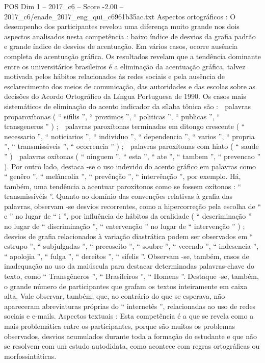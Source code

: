 \begin{textsample}{POS Dim 1 – 2017\_c6 – Score -2.00 – 2017\_c6/enade\_2017\_eng\_qui\_c6961b35ac.txt}
Aspectos ortográficos : O desempenho dos participantes revelou uma diferença muito grande nos dois aspectos analisados nesta competência : baixo índice de desvios da grafia padrão e grande índice de desvios de acentuação.
Em vários casos, ocorre ausência completa de acentuação gráfica.
Os resultados revelam que a tendência dominante entre os universitários brasileiros é a eliminação da acentuação gráfica, talvez motivada pelos hábitos relacionados às redes sociais e pela ausência de esclarecimento dos meios de comunicação, das autoridades e das escolas sobre as decisões do Acordo Ortográfico da Língua Portuguesa de 1990.
Os casos mais sistemáticos de eliminação do acento indicador da sílaba tônica são :  palavras proparoxítonas ( “ sifilis ”, “ proximos ”, “ politicas ”, “ publicas ”, “ transgeneros ” ) ;  palavras paroxítonas terminadas em ditongo crescente ( “ necessario ”, “ noticiarios ”, “ individuo ”, “ dependencia ”, “ varios ”, “ propria ”, “ transmissiveis ”, “ ocorrencia ” ) ;  palavras paroxítonas com hiato ( “ saude ” )  palavras oxítonas ( “ ninguem ”, “ esta ”, “ ate ”, “ tambem ”, “ prevencao ” ).
Por outro lado, destaca -se o uso indevido do acento gráfico em palavras como “ genêro ”, “ melâncolia ”, “ prevênção ”, “ intervênção ”, por exemplo.
Há, também, uma tendência a acentuar paroxítonos como se fossem oxítonos : “ transmissivéis ”.
Quanto ao domínio das convenções relativas à grafia das palavras, observam -se desvios recorrentes, como a hipercorreção pela escolha de “ e ” no lugar de “ i ”, por influência de hábitos da oralidade ( “ descriminação ” no lugar de “ discriminação ”, “ entervenção ” no lugar de “ intervenção ” ) ; desvios de grafia relacionados à variação diastrática podem ser observados em “ estrupo ”, “ subjulgadas ”, “ precoseito ”, “ soubre ”, “ vecendo ”, “ indesencia ”, “ apolojia ”, “ fulga ”, “ dereitos ”, “ sifelis ”.
Observam -se, também, casos de inadequação no uso da maiúscula para destacar determinadas palavras-chave do texto, como “ Transgêneros ”, “ Brasileiros ”, “ Homens ”.
Destaque -se, também, o grande número de participantes que grafam os textos inteiramente em caixa alta.
Vale observar, também, que, ao contrário do que se esperava, não apareceram abreviaturas próprias do “ internetês ”, relacionadas ao uso de redes sociais e e-mails.
Aspectos textuais : Esta competência é a que se revela como a mais problemática entre os participantes, porque são muitos os problemas observados, desvios acumulados durante toda a formação do estudante e que não se resolvem com um estudo autodidata, como acontece com regras ortográficas ou morfossintáticas.

\end{textsample}
